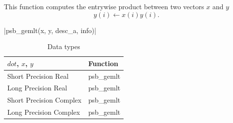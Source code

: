 This function computes the entrywise product between two vectors $x$ and
$y$
\[y(i) \leftarrow x(i) y(i).\]

\fortinline|psb_gemlt(x, y, desc_a, info)|

\begin{table}[h]
	\begin{center}
		\begin{tabular}{ll}
			\hline
			$dot$, $x$, $y$ & {\bf Function}\\
			\hline
			Short Precision Real & psb\_gemlt \\
			Long Precision Real & psb\_gemlt \\
			Short Precision Complex & psb\_gemlt \\
			Long Precision Complex & psb\_gemlt \\
			\hline
		\end{tabular}
	\end{center}
	\caption{Data types\label{tab:f90mlt}}
\end{table}


